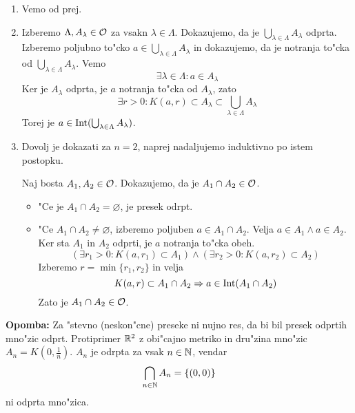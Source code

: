 \begin{enumerate}[(1)]
    \item Vemo od prej.
    \item Izberemo $\Lambda, A_\lambda \in \operatorname{\mathcal{O}}$ za vsakn $\lambda \in \Lambda$. Dokazujemo, da je $\bigcup_{\lambda \in \Lambda} A_\lambda$ odprta. Izberemo poljubno to"cko $a \in \bigcup_{\lambda \in \Lambda} A_\lambda$ in dokazujemo, da je notranja to"cka od $\bigcup_{\lambda \in \Lambda} A_\lambda$. Vemo
    \begin{equation*}
    \exists \lambda \in \Lambda: a \in A_\lambda
    \end{equation*}
    Ker je $A_\lambda$ odprta, je $a$ notranja to"cka od $A_\lambda$, zato 
    \begin{equation*}
    \exists r > 0: K(a, r) \subset A_\lambda \subset \bigcup_{\lambda \in \Lambda} A_\lambda
    \end{equation*}
    Torej je $a \in \operatorname{Int} (\bigcup_{\lambda \in \Lambda} A_\lambda)$.
    
    \item Dovolj je dokazati za $n=2$, naprej nadaljujemo induktivno po istem postopku.
    
    Naj bosta $A_1, A_2 \in \operatorname{\mathcal{O}}$. Dokazujemo, da je $A_1 \cap A_2 \in \operatorname{\mathcal{O}}$.
    \begin{itemize}
        \item "Ce je $A_1 \cap A_2 = \varnothing$, je presek odrpt.
        \item "Ce $A_1 \cap A_2 \neq \varnothing$, izberemo poljuben $a \in A_1 \cap A_2$. Velja $a \in A_1 \land a \in A_2$. Ker sta $A_1$ in $A_2$ odprti, je $a$ notranja to"cka obeh.
        \begin{equation*}
       (\exists r_1 > 0: K(a, r_1) \subset A_1) \land (\exists r_2 > 0: K(a, r_2) \subset A_2)
        \end{equation*}
        Izberemo $r = \min \{ r_1, r_2 \}$ in velja
        \begin{equation*}
        K(a, r) \subset A_1 \cap A_2 \Rightarrow a \in \operatorname{Int} (A_1 \cap A_2)
        \end{equation*}
        Zato je $A_1 \cap A_2 \in \operatorname{\mathcal{O}}$.
    \end{itemize}
\end{enumerate}
\textbf{Opomba:} Za "stevno (neskon"cne) preseke ni nujno res, da bi bil presek odprtih mno"zic odprt. Protiprimer $\mathbb{R}^2$ z obi"cajno metriko in dru"zina mno"zic $A_n = K \left( 0, \frac{1}{n} \right)$. $A_n$ je odrpta za vsak $n \in \mathbb{N}$, vendar
\begin{equation*}
\bigcap_{n \in \mathbb{N}} A_n = \{ (0, 0) \}
\end{equation*}
ni odprta mno"zica.

